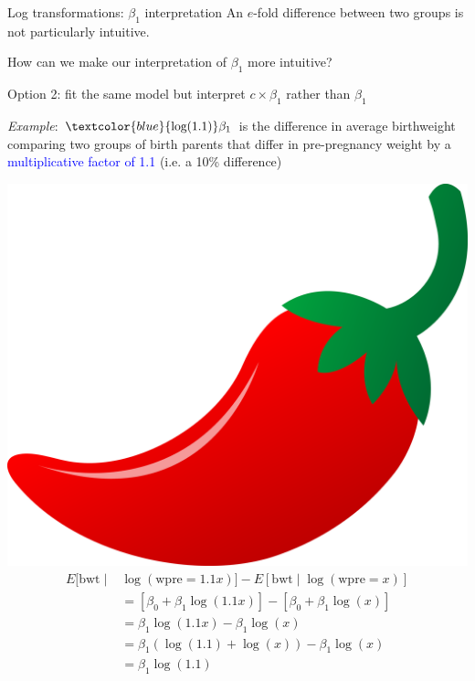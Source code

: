 \documentclass[10pt,t]{beamer}
\begin{document}
\begin{frame}{Log transformations: $\beta_1$ interpretation}
An $e$-fold difference between two groups is not particularly intuitive.

How can we make our interpretation of $\beta_1$ more intuitive?

\vspace{0.3cm}

Option 2: fit the same model but interpret $c \times \beta_1$ rather than $\beta_1$\pause

\vspace{0.3cm}

\textit{Example}: $\textcolor{blue}{\text{log}(1.1)}\beta_1$ is the difference in average birthweight comparing two groups of birth parents that differ in pre-pregnancy weight by a \textcolor{blue}{multiplicative factor of 1.1} (i.e. a 10\% difference)\pause

\includegraphics[scale=0.01]{chilipepper.png}
\begin{align*}
E[\text{bwt} \mid & \log(\text{wpre} = 1.1x)] - E[\text{bwt} \mid \log(\text{wpre} = x)] \\
& = [\beta_0 + \beta_1 \log(1.1x)] - [\beta_0 + \beta_1 \log(x)] \\
& = \beta_1 \log(1.1x) - \beta_1 \log(x) \\
& = \beta_1 (\log(1.1) + \log(x)) - \beta_1 \log(x) \\
& = \beta_1 \log(1.1)
\end{align*}

\end{frame}
\end{document}
